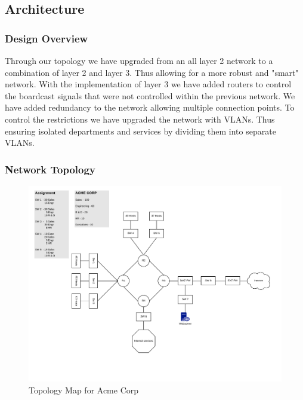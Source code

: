 \subsection{Architecture}
\subsubsection{Design Overview}
Through our topology we have upgraded from an all layer 2 network to a 
combination of layer 2 and layer 3. Thus allowing for a more robust and "smart" 
network. With the implementation of layer 3 we have added routers to control 
the boardcast signals that were not controlled within the previous network. We
have added redundancy to the network allowing multiple connection points. To 
control the restrictions we have upgraded the network with VLANs. Thus ensuring
isolated departments and services by dividing them into separate VLANs. 
 
\subsubsection{Network Topology}
\begin{figure}[!htb]
	\includegraphics[width=\textwidth]{images/networktopology.png}
	\caption{Topology Map for Acme Corp}
\end{figure}
